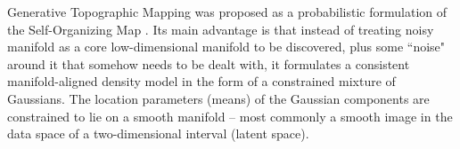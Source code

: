 
Generative Topographic Mapping \cite[GTM, ][]{Bishop1998GTMTG} was proposed as a probabilistic formulation of the Self-Organizing Map \citep{Kohonen1982}.
Its main advantage is that instead of treating noisy manifold as a core low-dimensional manifold to be discovered,
plus some ``noise" around it that somehow needs to be dealt with,
it formulates a consistent manifold-aligned density model in the form of a constrained mixture of Gaussians.
The location parameters (means) of the Gaussian components are constrained to lie on a smooth manifold
-- most commonly a smooth image in the data space of a two-dimensional interval (latent space).



